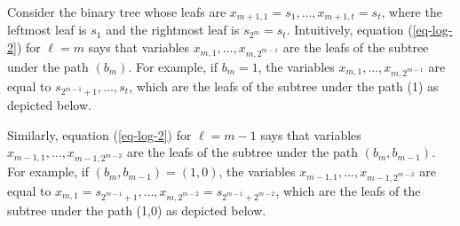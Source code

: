 Consider the binary tree whose leafs are $x_{m+1,1}=s_1,\ldots,x_{m+1,t}=s_{t}$, where the leftmost leaf is $s_1$ and the rightmost leaf is $s_{2^m}=s_t$. Intuitively, equation (\ref{eq-log-2}) for $\ell=m$ says that variables $x_{m,1},\ldots, x_{m,2^{m-1}}$ are the leafs of the subtree under the path $(b_m)$. For example, if $b_m=1$, the variables $x_{m,1},\ldots,x_{m,2^{m-1}}$ are equal to $s_{2^{m-1}+1},\ldots,s_{t}$, which are the leafs of the subtree under the path (1) as depicted below.
\begin{center}
\end{center}
Similarly, equation (\ref{eq-log-2}) for $\ell=m-1$ says that variables $x_{m-1,1},\ldots,x_{m-1,2^{m-2}}$ are the leafs of the subtree under the path $(b_m,b_{m-1})$. For example, if $(b_m,b_{m-1})=(1,0)$, the variables $x_{m-1,1},\ldots,x_{m-1,2^{m-2}}$ are equal to $x_{m,1}=s_{2^{m-1}+1},\ldots,\allowbreak x_{m,2^{m-2}}=s_{2^{m-1}+2^{m-2}}$, which are the leafs of the subtree under the path (1,0) as depicted below.
\begin{center}
\begin{tiny}\end{tiny}
\end{center}

